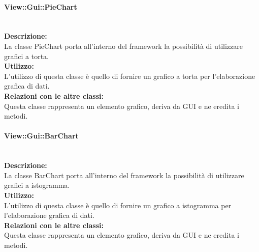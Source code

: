 \paragraph{View\-::Gui\-::Pie\-Chart}\label{gui-pie}\mbox{}\\
\textbf{Descrizione:}\\
La classe PieChart porta all'interno del framework la possibilità di utilizzare grafici a torta.\\
\textbf{Utilizzo:}\\
L'utilizzo di questa classe è quello di fornire un grafico a torta per l'elaborazione grafica di dati.\\
\textbf{Relazioni con le altre classi:}\\
Questa classe rappresenta un elemento grafico, deriva da GUI e ne eredita i metodi.\\

\paragraph{View\-::Gui\-::Bar\-Chart}\label{gui-bar}\mbox{}\\
\textbf{Descrizione:}\\
La classe BarChart porta all'interno del framework la possibilità di utilizzare grafici a istogramma.\\
\textbf{Utilizzo:}\\
L'utilizzo di questa classe è quello di fornire un grafico a istogramma per l'elaborazione grafica di dati.\\
\textbf{Relazioni con le altre classi:}\\
Questa classe rappresenta un elemento grafico, deriva da GUI e ne eredita i metodi.\\